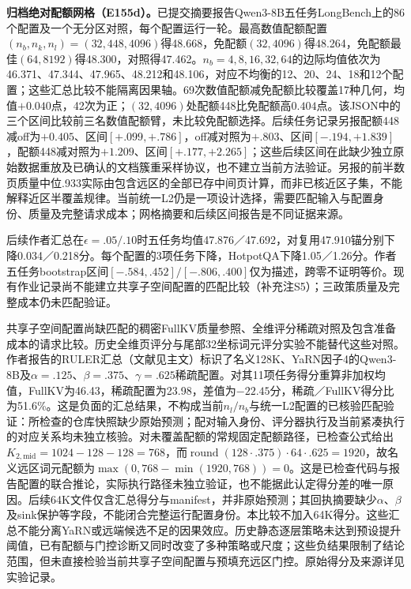 \documentclass[10pt,letterpaper]{article}
\begin{document}
\textbf{归档绝对配额网格（E155d）。}已提交摘要报告Qwen3-8B五任务LongBench上的86个配置及一个无分区对照，每个配置运行一轮。最高数值配额配置$(n_b,n_k,n_l)=(32,448,4096)$得48.668，免配额$(32,4096)$得48.264，免配额最佳$(64,8192)$得48.300，对照得47.462。$n_b=4,8,16,32,64$的边际均值依次为46.371、47.344、47.965、48.212和48.106，对应不均衡的12、20、24、18和12个配置；这些汇总比较不能隔离因果轴。69次数值配额减免配额比较覆盖17种几何，均值$+0.040$点，42次为正；$(32,4096)$处配额448比免配额高$0.404$点。该JSON中的三个区间比较前三名数值配额臂，未比较免配额选择。后续任务记录另报配额448减off为$+0.405$、区间$[+.099,+.786]$，off减对照为$+.803$、区间$[-.194,+1.839]$，配额448减对照为$+1.209$、区间$[+.177,+2.265]$；这些后续区间在此缺少独立原始数据重放及已确认的文档簇重采样协议，也不建立当前方法验证。另报的前半数页质量中位.933实际由包含远区的全部已存中间页计算，而非已核近区子集，不能解释近区半覆盖规律。当前统一L2仍是一项设计选择，需要匹配输入与配置身份、质量及完整请求成本；网格摘要和后续区间报告是不同证据来源。

后续作者汇总在$\epsilon=.05/.10$时五任务均值47.876／47.692，对复用47.910锚分别下降0.034／0.218分。每个配置的3项任务下降，HotpotQA下降1.05／1.26分。作者五任务bootstrap区间$[-.584,.452]/[-.806,.400]$仅为描述，跨零不证明等价。现有作业记录尚不能建立共享子空间配置的匹配比较（补充注S5）；三政策质量及完整成本仍未匹配验证。

共享子空间配置尚缺匹配的稠密FullKV质量参照、全维评分稀疏对照及包含准备成本的请求比较。历史全维页评分与尾部32坐标词元评分实验不能替代这些对照。作者报告的RULER汇总（文献见主文）标识了名义128K、YaRN因子4的Qwen3-8B及$\alpha=.125$、$\beta=.375$、$\gamma=.625$稀疏配置。对其11项任务得分重算非加权均值，FullKV为46.43，稀疏配置为23.98，差值为$-22.45$分，稀疏／FullKV得分比为51.6\%。这是负面的汇总结果，不构成当前$n_l/n_b$与统一L2配置的已核验匹配验证：所检查的仓库快照缺少原始预测；配对输入身份、评分器执行及当前紧凑执行的对应关系均未独立核验。对未覆盖配额的常规固定配额路径，已检查公式给出$K_{2,\mathrm{mid}}=1024-128-128=768$，而$\operatorname{round}(128\cdot .375)\cdot64\cdot .625=1920$，故名义远区词元配额为$\max(0,768-\min(1920,768))=0$。这是已检查代码与报告配置的联合推论，实际执行路径未独立验证，也不能据此认定得分差的唯一原因。后续64K文件仅含汇总得分与manifest，并非原始预测；其回执摘要缺少$\alpha$、$\beta$及sink保护等字段，不能闭合完整运行配置身份。本比较不加入64K得分。这些汇总不能分离YaRN或远端候选不足的因果效应。历史静态逐层策略未达到预设提升阈值，已有配额与门控诊断又同时改变了多种策略或尺度；这些负结果限制了结论范围，但未直接检验当前共享子空间配置与预填充远区门控。原始得分及来源详见实验记录。
\end{document}
